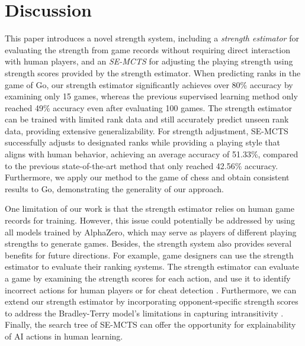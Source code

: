 \section{Discussion}
\label{sec:discussion}
This paper introduces a novel strength system, including a \textit{strength estimator} for evaluating the strength from game records without requiring direct interaction with human players, and an \textit{SE-MCTS} for adjusting the playing strength using strength scores provided by the strength estimator.
When predicting ranks in the game of Go, our strength estimator significantly achieves over 80\% accuracy by examining only 15 games, whereas the previous supervised learning method only reached 49\% accuracy even after evaluating 100 games.
The strength estimator can be trained with limited rank data and still accurately predict unseen rank data, providing extensive generalizability.
For strength adjustment, SE-MCTS successfully adjusts to designated ranks while providing a playing style that aligns with human behavior, achieving an average accuracy of 51.33\%, compared to the previous state-of-the-art method that only reached 42.56\% accuracy.
Furthermore, we apply our method to the game of chess and obtain consistent results to Go, demonstrating the generality of our approach. 

One limitation of our work is that the strength estimator relies on human game records for training.
However, this issue could potentially be addressed by using all models trained by AlphaZero, which may serve as players of different playing strengths to generate games.
Besides, the strength system also provides several benefits for future directions.
For example, game designers can use the strength estimator to evaluate their ranking systems.
The strength estimator can evaluate a game by examining the strength scores for each action, and use it to identify incorrect actions for human players or for cheat detection \citep{alayed_behavioralbased_2013}.
Furthermore, we can extend our strength estimator by incorporating opponent-specific strength scores to address the Bradley-Terry model's limitations in capturing intransitivity \citep{balduzzi_reevaluating_2018, bertrand_limitations_2023, omidshafiei_arank_2019, vadori_ordinal_2024}.
Finally, the search tree of SE-MCTS can offer the opportunity for explainability of AI actions in human learning.


